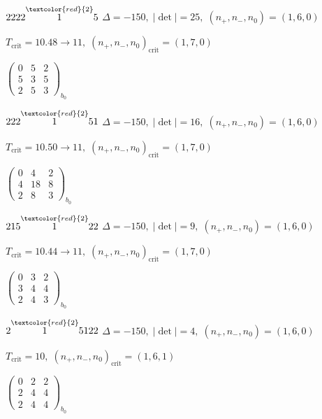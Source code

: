\documentclass[10pt]{article}
\begin{document}
$2222\overset{\textcolor{red}{2}}{1}5$ \quad $\Delta=-150,\; |\det|=25,\; (n_+,n_-,n_0)=(1,6,0)$

\hspace{1em}$T_{\text{crit}}=10.48 \to 11,\; (n_+,n_-,n_0)_{\text{crit}}=(1,7,0)$

\hspace{2em}$\left(\begin{smallmatrix}0 & 5 & 2 \\ 5 & 3 & 5 \\ 2 & 5 & 3\end{smallmatrix}\right)_{\!b_0}$

\smallskip

$222\overset{\textcolor{red}{2}}{1}51$ \quad $\Delta=-150,\; |\det|=16,\; (n_+,n_-,n_0)=(1,6,0)$

\hspace{1em}$T_{\text{crit}}=10.50 \to 11,\; (n_+,n_-,n_0)_{\text{crit}}=(1,7,0)$

\hspace{2em}$\left(\begin{smallmatrix}0 & 4 & 2 \\ 4 & 18 & 8 \\ 2 & 8 & 3\end{smallmatrix}\right)_{\!b_0}$

\smallskip

$215\overset{\textcolor{red}{2}}{1}22$ \quad $\Delta=-150,\; |\det|=9,\; (n_+,n_-,n_0)=(1,6,0)$

\hspace{1em}$T_{\text{crit}}=10.44 \to 11,\; (n_+,n_-,n_0)_{\text{crit}}=(1,7,0)$

\hspace{2em}$\left(\begin{smallmatrix}0 & 3 & 2 \\ 3 & 4 & 4 \\ 2 & 4 & 3\end{smallmatrix}\right)_{\!b_0}$

$2\overset{\textcolor{red}{2}}{1}5122$ \quad $\Delta=-150,\; |\det|=4,\; (n_+,n_-,n_0)=(1,6,0)$

\hspace{1em}$T_{\text{crit}}=10,\; (n_+,n_-,n_0)_{\text{crit}}=(1,6,1)$

\hspace{2em}$\left(\begin{smallmatrix}0 & 2 & 2 \\ 2 & 4 & 4 \\ 2 & 4 & 4\end{smallmatrix}\right)_{\!b_0}$
\end{document}
